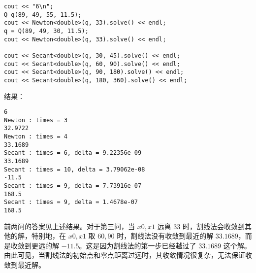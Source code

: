 \documentclass{ctexart}
\begin{document}
\begin{verbatim}
cout << "6\n";
Q q(89, 49, 55, 11.5);
cout << Newton<double>(q, 33).solve() << endl;
q = Q(89, 49, 30, 11.5);
cout << Newton<double>(q, 33).solve() << endl;

cout << Secant<double>(q, 30, 45).solve() << endl;
cout << Secant<double>(q, 60, 90).solve() << endl;
cout << Secant<double>(q, 90, 180).solve() << endl;
cout << Secant<double>(q, 180, 360).solve() << endl;
\end{verbatim}

结果：
\begin{verbatim}
6
Newton : times = 3
32.9722
Newton : times = 4
33.1689
Secant : times = 6, delta = 9.22356e-09
33.1689
Secant : times = 10, delta = 3.79062e-08
-11.5
Secant : times = 9, delta = 7.73916e-07
168.5
Secant : times = 9, delta = 1.4678e-07
168.5
\end{verbatim}

前两问的答案见上述结果。对于第三问，当 $x0,x1$ 远离 $33$ 时，割线法会收敛到其他的解，特别地，在 $x0,x1$ 取 $60,90$ 时，割线法没有收敛到最近的解 $33.1689$，而是收敛到更远的解 $-11.5$。这是因为割线法的第一步已经越过了 $33.1689$ 这个解。由此可见，当割线法的初始点和零点距离过远时，其收敛情况很复杂，无法保证收敛到最近解。
\end{document}
